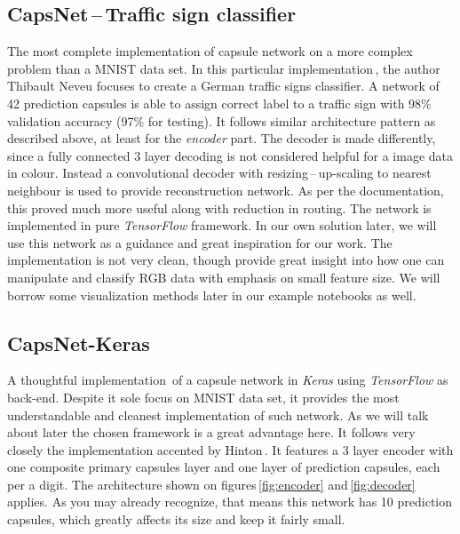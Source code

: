 \subsection{CapsNet\,--\,Traffic sign classifier}
\label{ss:traffic_signs}

The most complete implementation of capsule network on a more complex problem than a MNIST data set. In this particular implementation\,\cite{capsnet_traffic}, the author Thibault Neveu focuses to create a German traffic signs classifier. A network of 42 prediction capsules is able to assign correct label to a traffic sign with 98\% validation accuracy (97\% for testing). It follows similar architecture pattern as described above, at least for the \textit{encoder} part. The decoder is made differently, since a fully connected 3 layer decoding is not considered helpful for a image data in colour. Instead a convolutional decoder with resizing\,--\,up-scaling to nearest neighbour is used to provide reconstruction network. As per the documentation, this proved much more useful along with reduction in routing. The network is implemented in pure \textit{TensorFlow} framework. In our own solution later, we will use this network as a guidance and great inspiration for our work. The implementation is not very clean, though provide great insight into how one can manipulate and classify RGB data with emphasis on small feature size. We will borrow some visualization methods later in our example notebooks as well.

\subsection{CapsNet-Keras}

A thoughtful implementation\,\cite{capsnet_keras} of a capsule network in \textit{Keras} using \textit{TensorFlow} as back-end. Despite it sole focus on MNIST data set, it provides the most understandable and cleanest implementation of such network. As we will talk about later the chosen framework is a great advantage here. It follows very closely the implementation accented by Hinton\,\cite{capsule}. It features a 3 layer encoder with one composite primary capsules layer and one layer of prediction capsules, each per a digit. The architecture shown on figures\,\ref{fig:encoder} and\,\ref{fig:decoder} applies. As you may already recognize, that means this network has 10 prediction capsules, which greatly affects its size and keep it fairly small.



